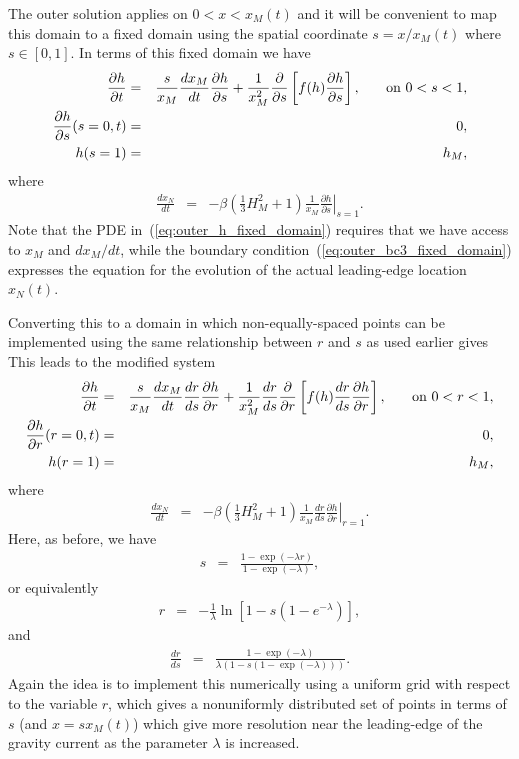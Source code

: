 \documentclass[11pt]{article}
\newcommand{\bea}{\begin{eqnarray}}
\newcommand{\eea}{\end{eqnarray}}
\begin{document}
The outer solution applies on $0 < x < x_M(t)$ and it will be convenient to map this domain to a fixed domain using the spatial coordinate $s=x/x_M(t)$ where $s \in [0,1]$.  In terms of this fixed domain we have
\bea
\label{eq:outer_h_fixed_domain}
\frac{\partial h}{\partial t} & = & \frac{s}{x_M} \frac{dx_M}{dt} \frac{\partial h}{\partial s} + \frac{1}{x_M^2} \frac{\partial}{\partial s} \left[ f(h)\frac{\partial h}{\partial s} \right], \hspace{0.25in} \mbox{on $0 < s < 1$},\\
\label{eq:outer_bc1_fixed_domain}
\frac{\partial h}{\partial s}(s=0,t) & = & 0,\\
\label{eq:outer_bc2_fixed_domain}
h(s=1) & = & h_M,
\eea
where
\bea
\label{eq:outer_bc3_fixed_domain}
\frac{dx_N}{dt} & = & - \beta \left( \frac{1}{3} H^2_M + 1 \right) \frac{1}{x_M} \left. \frac{\partial h}{\partial s} \right|_{s=1}.
\eea
Note that the PDE in~(\ref{eq:outer_h_fixed_domain}) requires that we have access to $x_M$ and $dx_M/dt$, while the boundary condition~(\ref{eq:outer_bc3_fixed_domain}) 
expresses the equation for the evolution of the actual leading-edge location $x_N(t)$.

Converting this to a domain in which non-equally-spaced points can be implemented using the same relationship between $r$ and $s$ as used earlier gives
This leads to the modified system
\bea
\label{eq:outer_h_fixed_domain_drds}
\frac{\partial h}{\partial t} & = & \frac{s}{x_M} \frac{dx_M}{dt} \frac{dr}{ds} \frac{\partial h}{\partial r} + \frac{1}{x_M^2} \frac{dr}{ds} \frac{\partial}{\partial r} \left[ f(h) \frac{dr}{ds} \frac{\partial h}{\partial r} \right], \hspace{0.25in} \mbox{on $0 < r < 1$},\\
\label{eq:outer_bc1_fixed_domain_drds}
\frac{\partial h}{\partial r}(r=0,t) & = & 0,\\
\label{eq:outer_bc2_fixed_domain_drds}
h(r=1) & = & h_M,
\eea
where
\bea
\label{eq:outer_bc3_fixed_domain_drds}
\frac{dx_N}{dt} & = & - \beta \left( \frac{1}{3} H^2_M + 1 \right)  \frac{1}{x_M} \frac{dr}{ds} \left. \frac{\partial h}{\partial r} \right|_{r=1}.
\eea
Here, as before, we have
\bea
s & = & \frac{1- \exp (-\lambda r)}{1 - \exp (-\lambda)},
\eea
or equivalently
\bea
r & = & - \frac{1}{\lambda} \ln \left[ 1 - s (1-e^{-\lambda}) \right],
\eea
and
\bea
\frac{dr}{ds} & = & \frac{ 1 - \exp(-\lambda) } {\lambda  (1 - s(1 - \exp(-\lambda)))}.
\eea
Again the idea is to implement this numerically using a uniform grid with respect to the variable $r$, which gives a nonuniformly distributed set of points in terms of
$s$ (and $x= s x_M(t)$) which give more resolution near the leading-edge of the gravity current as the parameter $\lambda$ is increased.
\end{document}
